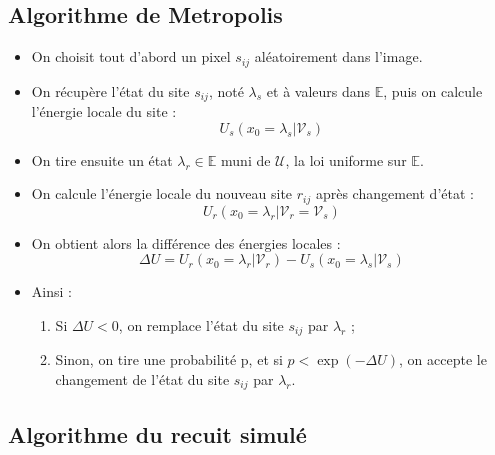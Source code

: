 \documentclass[a4paper, 12pt]{article}
\begin{document}
\subsection[Algorithme de Metropolis]{Algorithme de Metropolis}
\begin{itemize}
\item On choisit tout d'abord un pixel $s_{ij} $ aléatoirement dans l'image.
\item On récupère l'état du site $s_{ij} $, noté $\lambda_s$ et à valeurs dans $\mathbb{E}$, puis on calcule l'énergie locale du site : 
\[
  U_s(x_0=\lambda_s| \mathcal{V}_s)
\]
\item On tire ensuite un état $\lambda_r \in \mathbb{E}$ muni de $\mathcal{U}$, la loi uniforme sur $\mathbb{E}$.
\item On calcule l'énergie locale du nouveau site $r_{ij}$ après changement d'état : 
\[
  U_r(x_0=\lambda_r| \mathcal{V}_r = \mathcal{V}_s) 
\]
\item On obtient alors la différence des énergies locales : 
\[
  \Delta U = U_r(x_0=\lambda_r| \mathcal{V}_r)-U_s(x_0=\lambda_s| \mathcal{V}_s)
\]
\item Ainsi : 
\begin{enumerate}
  \item Si $\Delta U < 0$, on remplace l'état du site $s_{ij}$ par $\lambda_r$ ;
  \item Sinon, on tire une probabilité p, et si $p < \exp({-\Delta U })$, on accepte le changement de l'état du site $s_{ij}$ par $\lambda_r$.
\end{enumerate}
\end{itemize}

\subsection[Algorithme du recuit simulé]{Algorithme du recuit simulé}
\end{document}
